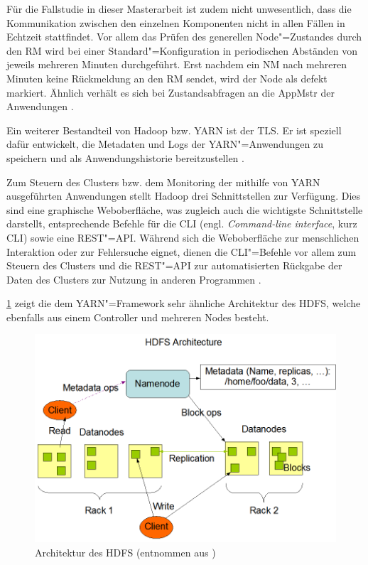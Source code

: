 Für die Fallstudie in dieser Masterarbeit ist zudem nicht unwesentlich, dass die Kommunikation zwischen den einzelnen Komponenten nicht in allen Fällen in Echtzeit stattfindet.
Vor allem das Prüfen des generellen Node"=Zustandes durch den \gls{RM} wird bei einer Standard"=Konfiguration in periodischen Abständen von jeweils mehreren Minuten durchgeführt.
Erst nachdem ein \gls{NM} nach mehreren Minuten keine Rückmeldung an den \gls{RM} sendet, wird der Node als defekt markiert.
Ähnlich verhält es sich bei Zustandsabfragen an die \gls{AppMstr} der Anwendungen \cite{HadoopYarnConfig271}.

Ein weiterer Bestandteil von Hadoop bzw. YARN ist der \gls{TLS}.
Er ist speziell dafür entwickelt, die Metadaten und Logs der YARN"=Anwendungen zu speichern und als Anwendungshistorie bereitzustellen \cite{HadoopYarnTlServer271}.

Zum Steuern des Clusters bzw. dem Monitoring der mithilfe von YARN ausgeführten Anwendungen stellt Hadoop drei Schnittstellen zur Verfügung.
Dies sind eine graphische Weboberfläche, was zugleich auch die wichtigste Schnittstelle darstellt, entsprechende Befehle für die \acrlong{CLI} (engl. \emph{Command-line interface}, kurz \acrshort{CLI}) sowie eine REST"=API.
Während sich die Weboberfläche zur menschlichen Interaktion oder zur Fehlersuche eignet, dienen die \gls{CLI}"=Befehle vor allem zum Steuern des Clusters und die REST"=API zur automatisierten Rückgabe der Daten des Clusters zur Nutzung in anderen Programmen \cite{HadoopClusterSetup271,HadoopYarnCmds271,HadoopRmApi271,HadoopNmApi271}.

\cref{fig:hdfsarch} zeigt die dem YARN"=Framework sehr ähnliche Architektur des HDFS, welche ebenfalls aus einem Controller und mehreren Nodes besteht.

\begin{figure}
    \includegraphics{./resources/hdfsarchitecture.png}
    \caption[Architektur des HDFS]
    {Architektur des HDFS (entnommen aus \cite{HadoopHdfsDesc271})}
    \label{fig:hdfsarch}
\end{figure}

